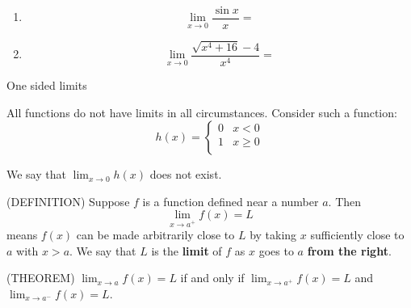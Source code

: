 \documentclass[11pt]{article}
\begin{document}
\begin{enumerate}
{\vspace{.8in}

  }

                \pagebreak
                
              \item{
\begin{displaymath}
  \lim_{x\to 0} \frac{\sin{x}}{x} = 
  \end{displaymath}

\vspace{.5in}

  }


                      \item{
\begin{displaymath}
  \lim_{x\to 0} \frac{\sqrt{x^4+16}-4}{x^4} = 
  \end{displaymath}

\vspace{2.5in}

  }


  \end{enumerate}


\begin{center}
\Large
\rm{One sided limits}
\end{center}

All functions do not have limits in all circumstances.  Consider such a function:
      \begin{displaymath}
h(x) =   \left\{ \begin{array}{ll}
 0 & x < 0 \\
1 & x \ge 0\\
\end{array} \right.
  \end{displaymath}

\vspace{0.2in}

We say that $\lim_{x \to 0}h(x)$ does not exist.  

\vspace{0.2in}
(DEFINITION)
 Suppose $f$ is a function defined near a number $a$.  Then 
\begin{displaymath}
  \lim_{x\to a^+}f(x) = L
  \end{displaymath}
means $f(x)$ can be made arbitrarily close to $L$ by taking $x$ sufficiently close to $a$ with $x>a$.  We say that $L$ is the {\bf limit} of $f$ as $x$ goes to $a$ {\bf from the right}.

\vspace{2.5in}

(THEOREM) $\lim_{x\to a}f(x) = L $ if and only if $\lim_{x\to a^+}f(x) = L $ and $\lim_{x\to a^-}f(x) = L $. \\
\end{document}
